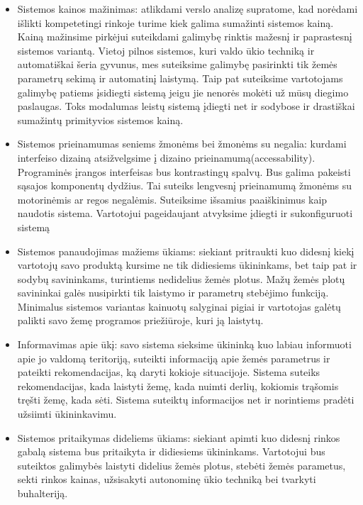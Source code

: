 \documentclass[oneside]{VUMIFPSkursinis}
\begin{document}
	\begin{itemize}
		\item{Sistemos kainos mažinimas: atlikdami verslo analizę supratome, kad norėdami išlikti kompetetingi rinkoje turime kiek galima sumažinti sistemos kainą. Kainą mažinsime pirkėjui suteikdami galimybę rinktis mažesnį ir paprastesnį sistemos variantą.  Vietoj pilnos sistemos, kuri valdo ūkio techniką ir automatiškai šeria gyvunus, mes suteiksime galimybę pasirinkti tik žemės parametrų sekimą ir automatinį laistymą. Taip pat suteiksime vartotojams galimybę patiems įsidiegti sistemą jeigu jie nenorės mokėti už mūsų diegimo paslaugas. Toks modalumas leistų sistemą įdiegti net ir sodybose ir drastiškai sumažintų primityvios sistemos kainą.}
		\item{Sistemos prieinamumas seniems žmonėms bei žmonėms su negalia: kurdami interfeiso dizainą atsižvelgsime į dizaino prieinamumą(accessability). Programinės įrangos interfeisas bus kontrastingų spalvų. Bus galima pakeisti sąsajos komponentų dydžius. Tai suteiks lengvesnį prieinamumą žmonėms su motorinėmis ar regos negalėmis. Suteiksime išsamius paaiškinimus kaip naudotis sistema. Vartotojui pageidaujant atvyksime įdiegti ir sukonfiguruoti sistemą}
		\item{Sistemos panaudojimas mažiems ūkiams: siekiant pritraukti kuo didesnį kiekį vartotojų savo produktą kursime ne tik didiesiems ūkininkams, bet taip pat ir sodybų savininkams, turintiems nedidelius žemės plotus. Mažų žemės plotų savininkai galės nusipirkti tik laistymo ir parametrų stebėjimo funkciją. Minimalus sistemos variantas kainuotų salyginai pigiai ir vartotojas galėtų palikti savo žemę programos priežiūroje, kuri ją laistytų.}
		\item{Informavimas apie ūkį: savo sistema sieksime ūkininką kuo labiau informuoti apie jo valdomą teritoriją, suteikti informaciją apie žemės parametrus ir pateikti rekomendacijas, ką daryti kokioje situacijoje. Sistema suteiks rekomendacijas, kada laistyti žemę, kada nuimti derlių, kokiomis trąšomis tręšti žemę, kada sėti. Sistema suteiktų informacijos net ir norintiems pradėti užsiimti ūkininkavimu.}
		\item{Sistemos pritaikymas dideliems ūkiams: siekiant apimti kuo didesnį rinkos gabalą sistema bus pritaikyta ir didiesiems ūkininkams. Vartotojui bus suteiktos galimybės laistyti didelius žemės plotus, stebėti žemės parametus, sekti rinkos kainas, užsisakyti autonominę ūkio techniką bei tvarkyti buhalteriją.}
	\end{itemize}
\end{document}
